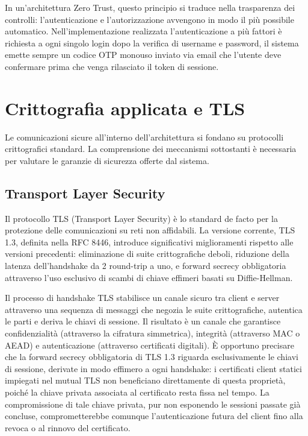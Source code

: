 In un'architettura Zero Trust, questo principio si traduce nella trasparenza dei controlli: l'autenticazione e l'autorizzazione avvengono in modo il più possibile automatico. Nell'implementazione realizzata l'autenticazione a più fattori è richiesta a ogni singolo login dopo la verifica di username e password, il sistema emette sempre un codice OTP monouso inviato via email che l'utente deve confermare prima che venga rilasciato il token di sessione. 

\section{Crittografia applicata e TLS}

Le comunicazioni sicure all'interno dell'architettura si fondano su protocolli crittografici standard. La comprensione dei meccanismi sottostanti è necessaria per valutare le garanzie di sicurezza offerte dal sistema.

\subsection{Transport Layer Security}

Il protocollo TLS (Transport Layer Security) è lo standard de facto per la protezione delle comunicazioni su reti non affidabili. La versione corrente, TLS 1.3, definita nella RFC 8446, introduce significativi miglioramenti rispetto alle versioni precedenti: eliminazione di suite crittografiche deboli, riduzione della latenza dell'handshake da 2 round-trip a uno, e forward secrecy obbligatoria attraverso l'uso esclusivo di scambi di chiave effimeri basati su Diffie-Hellman.

Il processo di handshake TLS stabilisce un canale sicuro tra client e server attraverso una sequenza di messaggi che negozia le suite crittografiche, autentica le parti e deriva le chiavi di sessione. Il risultato è un canale che garantisce confidenzialità (attraverso la cifratura simmetrica), integrità (attraverso MAC o AEAD) e autenticazione (attraverso certificati digitali). È opportuno precisare che la forward secrecy obbligatoria di TLS 1.3 riguarda esclusivamente le chiavi di sessione, derivate in modo effimero a ogni handshake: i certificati client statici impiegati nel mutual TLS non beneficiano direttamente di questa proprietà, poiché la chiave privata associata al certificato resta fissa nel tempo. La compromissione di tale chiave privata, pur non esponendo le sessioni passate già concluse, comprometterebbe comunque l'autenticazione futura del client fino alla revoca o al rinnovo del certificato.

